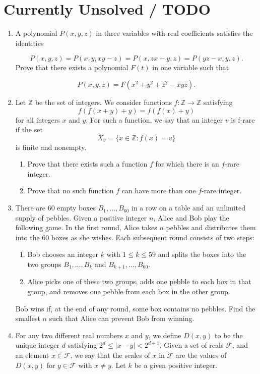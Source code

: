 \documentclass[11pt,a4paper]{article}
\begin{document}
\section*{Currently Unsolved / TODO}
\begin{enumerate}
	\item [\textbf{A6.}] A polynomial $P(x, y, z)$ in three variables with real coefficients satisfies the identities
	
	$$P(x, y, z)=P(x, y, xy-z)=P(x, zx-y, z)=P(yz-x, y, z).$$
	Prove that there exists a polynomial $F(t)$ in one variable such that
	
	$$P(x,y,z)=F(x^2+y^2+z^2-xyz).$$
	
	\item [\textbf{A7.}] Let $\mathbb Z$ be the set of integers. We consider functions $f :\mathbb Z\to\mathbb Z$ satisfying
	\[f\left(f(x+y)+y\right)=f\left(f(x)+y\right)\]for all integers $x$ and $y$. For such a function, we say that an integer $v$ is f-rare if the set
	\[X_v=\{x\in\mathbb Z:f(x)=v\}\]is finite and nonempty.
	\begin{enumerate}
		\item [(a)] Prove that there exists such a function $f$ for which there is an $f$-rare integer.
		\item [(b)] Prove that no such function $f$ can have more than one $f$-rare integer.
	\end{enumerate}
	
	\item [\textbf{C7}.] There are 60 empty boxes $B_1,\ldots,B_{60}$ in a row on a table and an unlimited supply of pebbles. Given a positive integer $n$, Alice and Bob play the following game.
	In the first round, Alice takes $n$ pebbles and distributes them into the 60 boxes as she wishes. Each subsequent round consists of two steps:
	\begin{enumerate}
		\item[(a)] Bob chooses an integer $k$ with $1\leq k\leq 59$ and splits the boxes into the two groups $B_1,\ldots,B_k$ and $B_{k+1},\ldots,B_{60}$.
		\item[(b)] Alice picks one of these two groups, adds one pebble to each box in that group, and removes one pebble from each box in the other group.
	\end{enumerate}
	Bob wins if, at the end of any round, some box contains no pebbles. Find the smallest $n$ such that Alice can prevent Bob from winning.
	
	\item [\textbf{C9.}] For any two different real numbers $x$ and $y$, we define $D(x,y)$ to be the unique integer $d$ satisfying $2^d\le |x-y| < 2^{d+1}$. Given a set of reals $\mathcal F$, and an element $x\in \mathcal F$, we say that the scales of $x$ in $\mathcal F$ are the values of $D(x,y)$ for $y\in\mathcal F$ with $x\neq y$. Let $k$ be a given positive integer.
	
	
\end{enumerate}
\end{document}
